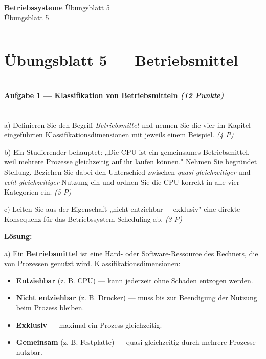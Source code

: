 \documentclass[11pt, a4paper]{article}
\providecommand{\nichttitle}{Übungsblatt}
\providecommand{\nichtsubtitle}{}
\renewcommand{\nichttitle}{Betriebssysteme}
\renewcommand{\nichtsubtitle}{Übungsblatt 5}
\begin{document}
\begin{center}
{\Large\bfseries\color{accent}\nichttitle}
\ifx\nichtsubtitle\empty\else
  \\[2pt]{\normalsize\color{accent!80!black}\nichtsubtitle}
\fi
\\[2pt]
\color{accent}\rule{0.4\linewidth}{0.8pt}\color{black}
\end{center}
\vspace{4pt}


\section{Übungsblatt 5 — Betriebsmittel}


\noindent\textcolor{rulegray}{\rule{\linewidth}{0.4pt}}


\paragraph{Aufgabe 1 — Klassifikation von Betriebsmitteln \textit{(12 Punkte)}}\mbox{}\\[2pt]

a) Definieren Sie den Begriff \textit{Betriebsmittel} und nennen Sie die vier im Kapitel eingeführten Klassifikationsdimensionen mit jeweils einem Beispiel. \textit{(4 P)}


b) Ein Studierender behauptet: „Die CPU ist ein gemeinsames Betriebsmittel, weil mehrere Prozesse gleichzeitig auf ihr laufen können." Nehmen Sie begründet Stellung. Beziehen Sie dabei den Unterschied zwischen \textit{quasi-gleichzeitiger} und \textit{echt gleichzeitiger} Nutzung ein und ordnen Sie die CPU korrekt in alle vier Kategorien ein. \textit{(5 P)}


c) Leiten Sie aus der Eigenschaft „nicht entziehbar + exklusiv" eine direkte Konsequenz für das Betriebssystem-Scheduling ab. \textit{(3 P)}


\textbf{Lösung:}


a) Ein \textbf{Betriebsmittel} ist eine Hard- oder Software-Ressource des Rechners, die von Prozessen genutzt wird. Klassifikationsdimensionen:

\begin{itemize}
  \item \textbf{Entziehbar} (z. B. CPU) — kann jederzeit ohne Schaden entzogen werden.
  \item \textbf{Nicht entziehbar} (z. B. Drucker) — muss bis zur Beendigung der Nutzung beim Prozess bleiben.
  \item \textbf{Exklusiv} — maximal ein Prozess gleichzeitig.
  \item \textbf{Gemeinsam} (z. B. Festplatte) — quasi-gleichzeitig durch mehrere Prozesse nutzbar.
\end{itemize}
\end{document}
